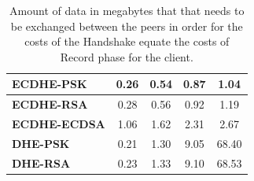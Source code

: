 \begin{table}[]
\begin{tabular}{|l|c|c|c|c|}
  \textbf{ECDHE-PSK}   & 0.26                                                        & 0.54                                                           & 0.87                                                         & 1.04                                                              \\ \hline
  \textbf{ECDHE-RSA}   & 0.28                                                        & 0.56                                                           & 0.92                                                         & 1.19                                                              \\ \hline
  \textbf{ECDHE-ECDSA} & 1.06                                                        & 1.62                                                           & 2.31                                                         & 2.67                                                              \\ \hline
  \textbf{DHE-PSK}     & 0.21                                                        & 1.30                                                           & 9.05                                                         & 68.40                                                             \\ \hline
  \textbf{DHE-RSA}     & 0.23                                                        & 1.33                                                           & 9.10                                                         & 68.53                                                             \\ \hline
  \end{tabular}
  \caption{Amount of data in megabytes that that needs to be exchanged between the peers in order for the costs of the Handshake equate the costs of Record phase for the client.}
  \label{tab:conf-hs-client}
  \end{table}

